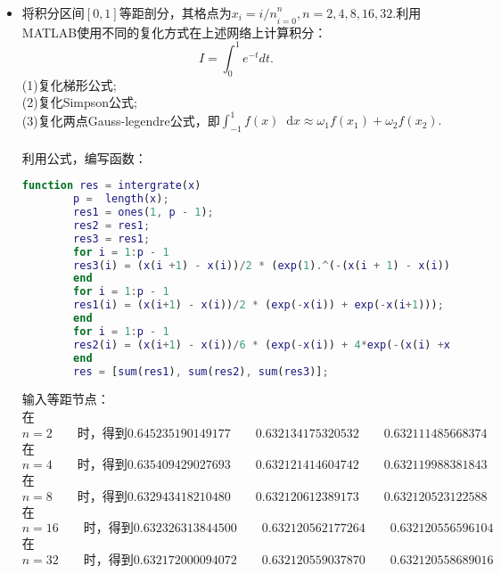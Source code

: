 \documentclass{article}
\newcommand*{\dif}{\mathop{}\!\mathrm{d}}
\begin{document}
\begin{itemize}
		\item[7.]将积分区间$[0,1]$等距剖分，其格点为${x_i = i/n}^{n}_{i = 0},n = 2, 4, 8, 16, 32.$利用MATLAB使用不同的复化方式在上述网络上计算积分：
		$$I = \int_{0}^{1}e^{-t}dt.$$
		(1)复化梯形公式;\\
		(2)复化Simpson公式;\\
		(3)复化两点Gauss-legendre公式，即$\int_{-1}^{1}f(x)\dif x\approx \omega_{1}f(x_1) + \omega_{2}f(x_2).$\\\\
		利用公式，编写函数：
		\begin{lstlisting}[language=MATLAB]
		function res = intergrate(x)
		p =  length(x);
		res1 = ones(1, p - 1);
		res2 = res1;
		res3 = res1;
		for i = 1:p - 1
		res3(i) = (x(i +1) - x(i))/2 * (exp(1).^(-(x(i + 1) - x(i))/(2*3.^(0.5)) - (x(i+1) + x(i))/ 2) + exp(1).^((x(i+1) -x(i))/ (2*3.^0.5) - (x(i+1) +x(i))/ 2));
		end
		for i = 1:p - 1
		res1(i) = (x(i+1) - x(i))/2 * (exp(-x(i)) + exp(-x(i+1)));
		end
		for i = 1:p - 1
		res2(i) = (x(i+1) - x(i))/6 * (exp(-x(i)) + 4*exp(-(x(i) +x(i+1))/2) + exp(-x(i+1)));
		end
		res = [sum(res1), sum(res2), sum(res3)];
		\end{lstlisting}
		输入等距节点：\\
		在$n = 2\qquad \mbox{时，得到}0.645235190149177\qquad0.632134175320532\qquad0.632111485668374$\\
		在$n = 4\qquad \mbox{时，得到}0.635409429027693\qquad0.632121414604742\qquad0.632119988381843$\\
		在$n = 8\qquad \mbox{时，得到}0.632943418210480\qquad0.632120612389173\qquad0.632120523122588$\\
		在$n = 16\qquad \mbox{时，得到}0.632326313844500\qquad0.632120562177264\qquad0.632120556596104$\\
		在$n = 32\qquad \mbox{时，得到}0.632172000094072\qquad0.632120559037870\qquad0.632120558689016$\\
	\end{itemize}
\end{document}
